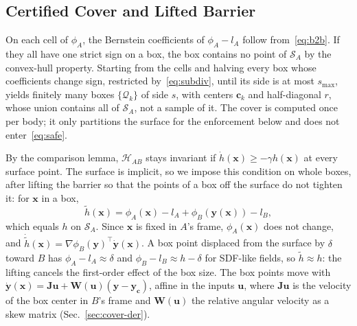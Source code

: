 \documentclass[journal]{IEEEtran}
\theoremstyle{definition}
\begin{document}
\subsection{Certified Cover and Lifted Barrier}
On each cell of $\phi_A$, the Bernstein coefficients of $\phi_A-l_A$ follow from~\eqref{eq:b2b}. If
they all have one strict sign on a box, the box contains no point of $\mathcal S_A$ by the
convex-hull property. Starting from the cells and halving every box whose coefficients change sign,
restricted by~\eqref{eq:subdiv}, until its side is at most $s_{\max}$, yields finitely many boxes
$\{\mathcal Q_k\}$ of side $s$, with centers $\mathbf c_k$ and half-diagonal $r$, whose union contains
all of $\mathcal S_A$, not a sample of it. The cover is computed once per body; it only partitions
the surface for the enforcement below and does not enter~\eqref{eq:safe}.

By the comparison lemma, $\mathcal H_{AB}$ stays invariant if $\dot h(\mathbf x)\ge-\gamma h(\mathbf x)$
at every surface point. The surface is implicit, so we impose this condition on whole boxes, after
lifting the barrier so that the points of a box off the surface do not tighten it: for $\mathbf x$ in a
box,
\begin{equation}\label{eq:lift}
\tilde h(\mathbf x)=\phi_A(\mathbf x)-l_A+\phi_B(\mathbf y(\mathbf x))-l_B ,
\end{equation}
which equals $h$ on $\mathcal S_A$. Since $\mathbf x$ is fixed in $A$'s frame, $\phi_A(\mathbf x)$ does
not change, and $\dot{\tilde h}(\mathbf x)=\nabla\phi_B(\mathbf y)^\top\dot{\mathbf y}(\mathbf x)$. A
box point displaced from the surface by $\delta$ toward $B$ has $\phi_A-l_A\approx\delta$ and
$\phi_B-l_B\approx h-\delta$ for SDF-like fields, so $\tilde h\approx h$: the lifting cancels the
first-order effect of the box size. The box points move with
$\dot{\mathbf y}(\mathbf x)=\mathbf J\mathbf u+\mathbf W(\mathbf u)(\mathbf y-\mathbf y_{\mathbf c})$,
affine in the inputs $\mathbf u$, where $\mathbf J\mathbf u$ is the velocity of the box center in
$B$'s frame and $\mathbf W(\mathbf u)$ the relative angular velocity as a skew matrix
(Sec.~\ref{sec:cover-der}).
\end{document}
